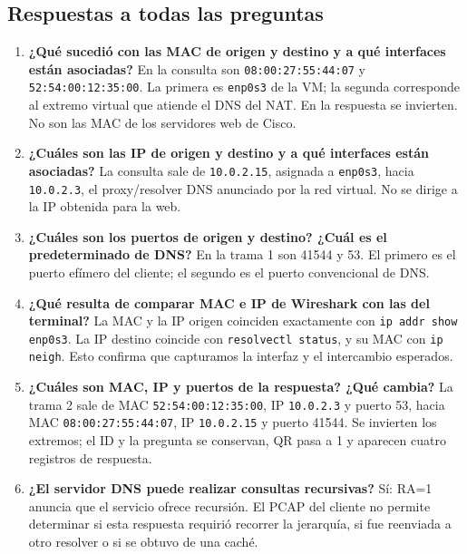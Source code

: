 \documentclass[11pt,a4paper]{article}
\begin{document}
\subsection{Respuestas a todas las preguntas}
\label{sec:respuestas1}
\begin{enumerate}[label=\textbf{\arabic*.},leftmargin=*]
\item \textbf{¿Qué sucedió con las MAC de origen y destino y a qué interfaces
están asociadas?} En la consulta son \texttt{08:00:27:55:44:07} y
\texttt{52:54:00:12:35:00}. La primera es \texttt{enp0s3} de la VM; la
segunda corresponde al extremo virtual que atiende el DNS del NAT. En la
respuesta se invierten. No son las MAC de los servidores web de Cisco.

\item \textbf{¿Cuáles son las IP de origen y destino y a qué interfaces
están asociadas?} La consulta sale de \nolinkurl{10.0.2.15}, asignada a
\texttt{enp0s3}, hacia \nolinkurl{10.0.2.3}, el proxy/resolver DNS anunciado
por la red virtual. No se dirige a la IP obtenida para la web.

\item \textbf{¿Cuáles son los puertos de origen y destino? ¿Cuál es el
predeterminado de DNS?} En la trama 1 son 41544 y 53. El primero es el
puerto efímero del cliente; el segundo es el puerto convencional de DNS.

\item \textbf{¿Qué resulta de comparar MAC e IP de Wireshark con las del
terminal?} La MAC y la IP origen coinciden exactamente con
\texttt{ip addr show enp0s3}. La IP destino coincide con
\texttt{resolvectl status}, y su MAC con \texttt{ip neigh}. Esto confirma
que capturamos la interfaz y el intercambio esperados.

\item \textbf{¿Cuáles son MAC, IP y puertos de la respuesta? ¿Qué cambia?}
La trama 2 sale de MAC \texttt{52:54:00:12:35:00}, IP \nolinkurl{10.0.2.3}
y puerto 53, hacia MAC \texttt{08:00:27:55:44:07}, IP \nolinkurl{10.0.2.15}
y puerto 41544. Se invierten los extremos; el ID y la pregunta se conservan,
QR pasa a 1 y aparecen cuatro registros de respuesta.

\item \textbf{¿El servidor DNS puede realizar consultas recursivas?}
Sí: RA=1 anuncia que el servicio ofrece recursión. El PCAP del cliente
no permite determinar si esta respuesta requirió recorrer la jerarquía,
si fue reenviada a otro resolver o si se obtuvo de una caché.


\end{enumerate}
\end{document}
